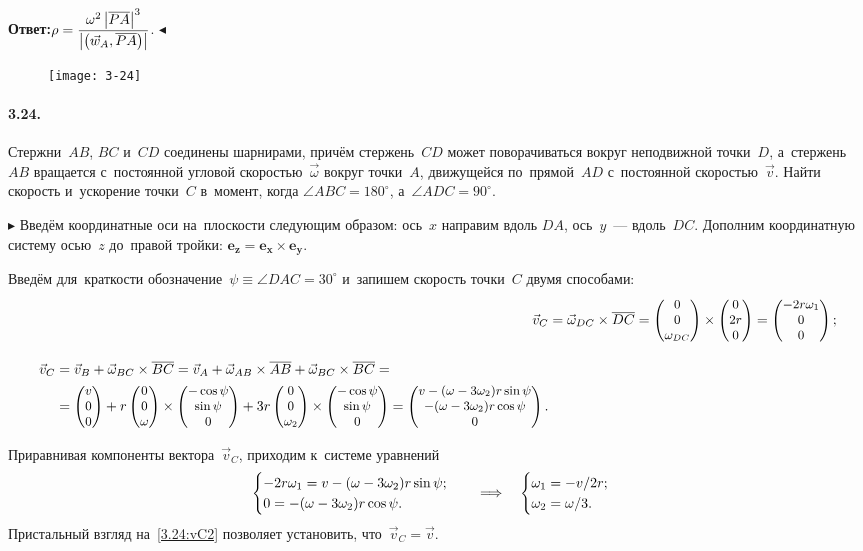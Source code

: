 \documentclass{weekly}
\begin{document}
\textbf{Ответ:}\quad $\rho = \dfrac{\omega^2 \left| \overline{PA} \right|^3}
{\left| \left(\vec w_A, \overline{PA}\right) \right|}$.
\hfill $\blacktriangleleft$


\begin{wrapfigure}[7]{r}{6cm}\vspace{-6mm}
    \texttt{[image: 3-24]}
\end{wrapfigure}
\paragraph{3.24.} Стержни~$AB$, $BC$ и~$CD$ соединены шарнирами,
причём стержень~$CD$ может поворачиваться вокруг неподвижной точки~$D$,
а~стержень~$AB$ вращается с~постоянной угловой скоростью~$\vec\omega$
вокруг точки~$A$, движущейся по~прямой~$AD$ с~постоянной
скоростью~$\vec v$. Найти скорость и~ускорение точки~$C$ в~момент,
когда $\angle ABC = 180^\circ$, а~$\angle ADC = 90^\circ$.

$\blacktriangleright$ Введём координатные оси на~плоскости следующим
образом: ось~$x$ направим вдоль $DA$, ось~$y$~--- вдоль~$DC$.
Дополним координатную систему осью~$z$ до~правой тройки:
$\mathbf{e_z} = \mathbf{e_x} \times \mathbf{e_y}$.

Введём для~краткости обозначение~$\psi \equiv \angle DAC = 30^\circ$
и~запишем скорость точки~$C$ двумя способами:
\begin{align}
    \vec v_C &= \vec\omega_{DC} \times \overline{DC}
        = \small\begin{pmatrix}0\\0\\\omega_{DC}\end{pmatrix} \times \small\begin{pmatrix}0\\2r\\0\end{pmatrix}
        = \small\begin{pmatrix}-2r\omega_1\\0\\0\end{pmatrix}; \\[2ex]
\begin{split}
    \vec v_C &= \vec v_B + \vec\omega_{BC} \times \overline{BC}
        = \vec v_A + \vec\omega_{AB} \times \overline{AB} +
            \vec\omega_{BC} \times \overline{BC} =\\
        &= \small\begin{pmatrix}v\\0\\0\end{pmatrix} + r \small\begin{pmatrix}0\\0\\\omega\end{pmatrix} \times
            \small\begin{pmatrix}-\cos\psi\\\sin\psi\\0\end{pmatrix} +
            3r \small\begin{pmatrix}0\\0\\\omega_2\end{pmatrix} \times
            \small\begin{pmatrix}-\cos\psi\\\sin\psi\\0\end{pmatrix}
        = \small\begin{pmatrix}v - (\omega - 3\omega_2) r\sin\psi\\-(\omega - 3\omega_2) r\cos\psi\\0\end{pmatrix}. \label{3.24:vC2}
\end{split}
\end{align}

Приравнивая компоненты вектора~$\vec v_C$, приходим к~системе уравнений
\begin{gather}
    \begin{cases}
        -2r\omega_1 = v - (\omega - 3\omega_2) r\sin\psi; \\
        0 = -(\omega - 3\omega_2) r\cos\psi.
    \end{cases}
    \quad \Longrightarrow \quad
    \begin{cases}
        \omega_1 = -v/{2r};\\
        \omega_2 = \omega/3.
    \end{cases}
\end{gather}
Пристальный взгляд на~\eqref{3.24:vC2} позволяет установить,
что~$\vec v_C = \vec v$.
\end{document}

